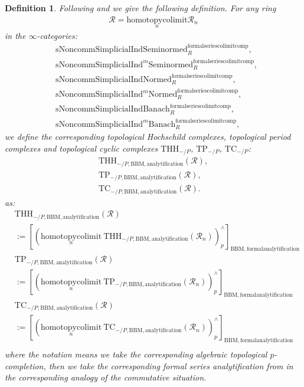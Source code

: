 \documentclass[12pt]{book}
\newtheorem{definition}{Definition}
\begin{document}
\begin{definition}
Following \cite[Section 2.3]{BMS} and \cite[Chapter 3]{NS} we give the following definition. For any ring
\begin{align}
\mathcal{R}=\underset{n}{\mathrm{homotopycolimit}}\mathcal{R}_n	
\end{align}
in the $\infty$-categories:
\begin{align}
&\mathrm{sNoncomm}\mathrm{Simplicial}\mathrm{Ind}\mathrm{Seminormed}^\mathrm{formalseriescolimitcomp}_R,\\
&\mathrm{sNoncomm}\mathrm{Simplicial}\mathrm{Ind}^m\mathrm{Seminormed}^\mathrm{formalseriescolimitcomp}_R,\\
&\mathrm{sNoncomm}\mathrm{Simplicial}\mathrm{Ind}\mathrm{Normed}^\mathrm{formalseriescolimitcomp}_R,\\
&\mathrm{sNoncomm}\mathrm{Simplicial}\mathrm{Ind}^m\mathrm{Normed}^\mathrm{formalseriescolimitcomp}_R,\\
&\mathrm{sNoncomm}\mathrm{Simplicial}\mathrm{Ind}\mathrm{Banach}^\mathrm{formalseriescolimitcomp}_R,\\
&\mathrm{sNoncomm}\mathrm{Simplicial}\mathrm{Ind}^m\mathrm{Banach}^\mathrm{formalseriescolimitcomp}_R,	
\end{align}	
we define the corresponding topological Hochschild complexes, topological period complexes and topological cyclic complexes $\mathrm{THH}_{-/P}$, $\mathrm{TP}_{-/P}$, $\mathrm{TC}_{-/P}$:
\begin{align}
 \mathrm{THH}_{-/P,\mathrm{BBM},\mathrm{analytification}}(\mathcal{R}),\\
 \mathrm{TP}_{-/P,\mathrm{BBM},\mathrm{analytification}}(\mathcal{R}),\\
 \mathrm{TC}_{-/P,\mathrm{BBM},\mathrm{analytification}}(\mathcal{R}). 
\end{align}
as:
\begin{align}
& \mathrm{THH}_{-/P,\mathrm{BBM},\mathrm{analytification}}(\mathcal{R})\\
&:=[(\underset{n}{\mathrm{homotopycolimit}}~  \mathrm{THH}_{-/P,\mathrm{BBM},\mathrm{analytification}}(\mathcal{R}_n))^\wedge_{p}]_{\mathrm{BBM},\mathrm{formalanalytification}}\\
& \mathrm{TP}_{-/P,\mathrm{BBM},\mathrm{analytification}}(\mathcal{R})\\
&:=[(\underset{n}{\mathrm{homotopycolimit}}~  \mathrm{TP}_{-/P,\mathrm{BBM},\mathrm{analytification}}(\mathcal{R}_n))^\wedge_{p}]_{\mathrm{BBM},\mathrm{formalanalytification}}\\
& \mathrm{TC}_{-/P,\mathrm{BBM},\mathrm{analytification}}(\mathcal{R})\\
&:=[(\underset{n}{\mathrm{homotopycolimit}}~  \mathrm{TC}_{-/P,\mathrm{BBM},\mathrm{analytification}}(\mathcal{R}_n))^\wedge_{p}]_{\mathrm{BBM},\mathrm{formalanalytification}}\\	
\end{align}
where the notation means we take the corresponding algebraic topological $p$-completion, then we take the corresponding formal series analytification from \cite[4.2]{BBM} in the corresponding analogy of the commutative situation.\\
\end{definition}
\end{document}
